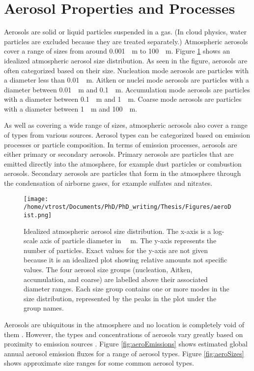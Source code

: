 \section{Aerosol Properties and Processes} \label{ch:aero}
Aerosols are solid or liquid particles suspended in a gas. (In cloud physics, water particles are excluded because they are treated separately.) \citep{bouc2015} Atmospheric aerosols cover a range of sizes from around \SI{0.001}{\mu m} to \SI{100}{\mu m}. Figure \ref{fig:aeroDist} shows an idealized atmospheric aerosol size distribution. As seen in the figure, aerosols are often categorized based on their size. Nucleation mode aerosols are particles with a diameter less than \SI{0.01}{\mu m}. Aitken or nuclei mode aerosols are particles with a diameter between \SI{0.01}{\mu m} and \SI{0.1}{\mu m}. Accumulation mode aerosols are particles with a diameter between \SI{0.1}{\mu m} and \SI{1}{\mu m}. Coarse mode aerosols are particles with a diameter between \SI{1}{\mu m} and \SI{100}{\mu m}. \citep{desh2003,mcmu2003,bouc2015}

As well as covering a wide range of sizes, atmospheric aerosols also cover a range of types from various sources. Aerosol types can be categorized based on emission processes or particle composition. In terms of emission processes, aerosols are either primary or secondary aerosols. Primary aerosols are particles that are emitted directly into the atmosphere, for example dust particles or combustion aerosols. Secondary aerosols are particles that form in the atmosphere through the condensation of airborne gases, for example sulfates and nitrates. \citep{mcmu2003,bouc2015}

\begin{figure}[H]
	\centering
	\texttt{[image: /home/vtrost/Documents/PhD/PhD\_writing/Thesis/Figures/aeroDist.png]}
	\caption{Idealized atmospheric aerosol size distribution. The x-axis is a log-scale axis of particle diameter in \SI{}{\mu m}. The y-axis represents the number of particles. Exact values for the y-axis are not given because it is an idealized plot showing relative amounts not specific values. The four aerosol size groups (nucleation, Aitken, accumulation, and coarse) are labelled above their associated diameter ranges. Each size group contains one or more modes in the size distribution, represented by the peaks in the plot under the group names. \citep[][Figure 1]{mcmu2003}}
	\label{fig:aeroDist}
\end{figure}

Aerosols are ubiquitous in the atmosphere and no location is completely void of them \citep{sein2003}. However, the types and concentrations of aerosols vary greatly based on proximity to emission sources \citep{bouc2015}. Figure \ref{fig:aeroEmissions} shows estimated global annual aerosol emission fluxes for a range of aerosol types. Figure \ref{fig:aeroSizes} shows approximate size ranges for some common aerosol types.

